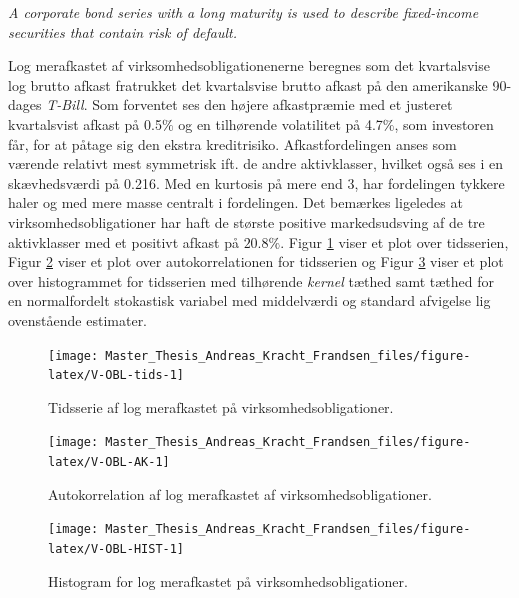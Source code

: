 \documentclass[
  a4paper,
  oneside]{memoir}
\begin{document}
\begin{center}
\textit{A corporate bond series with a long maturity is used to describe fixed-income securities that contain risk of default.}
\end{center}

Log merafkastet af virksomhedsobligationenerne beregnes som det kvartalsvise log brutto afkast fratrukket det kvartalsvise brutto afkast på den amerikanske 90-dages \emph{T-Bill}. Som forventet ses den højere afkastpræmie med et justeret kvartalsvist afkast på 0.5\(\%\) og en tilhørende volatilitet på 4.7\(\%\), som investoren får, for at påtage sig den ekstra kreditrisiko. Afkastfordelingen anses som værende relativt mest symmetrisk ift. de andre aktivklasser, hvilket også ses i en skævhedsværdi på 0.216. Med en kurtosis på mere end \(3\), har fordelingen tykkere haler og med mere masse centralt i fordelingen. Det bemærkes ligeledes at virksomhedsobligationer har haft de største positive markedsudsving af de tre aktivklasser med et positivt afkast på \(20.8 \%\). Figur \ref{fig:V-OBL-tids} viser et plot over tidsserien, Figur \ref{fig:V-OBL-AK} viser et plot over autokorrelationen for tidsserien og Figur \ref{fig:V-OBL-HIST} viser et plot over histogrammet for tidsserien med tilhørende \emph{kernel} tæthed samt tæthed for en normalfordelt stokastisk variabel med middelværdi og standard afvigelse lig ovenstående estimater.

\begin{figure}[H]

{\centering \texttt{[image: Master\_Thesis\_Andreas\_Kracht\_Frandsen\_files/figure-latex/V-OBL-tids-1]} 

}

\caption{Tidsserie af log merafkastet på virksomhedsobligationer.}\label{fig:V-OBL-tids}
\end{figure}

\begin{figure}[H]

{\centering \texttt{[image: Master\_Thesis\_Andreas\_Kracht\_Frandsen\_files/figure-latex/V-OBL-AK-1]} 

}

\caption{Autokorrelation af log merafkastet af virksomhedsobligationer.}\label{fig:V-OBL-AK}
\end{figure}

\begin{figure}[H]

{\centering \texttt{[image: Master\_Thesis\_Andreas\_Kracht\_Frandsen\_files/figure-latex/V-OBL-HIST-1]} 

}

\caption{Histogram for log merafkastet på virksomhedsobligationer.}\label{fig:V-OBL-HIST}
\end{figure}
\end{document}
